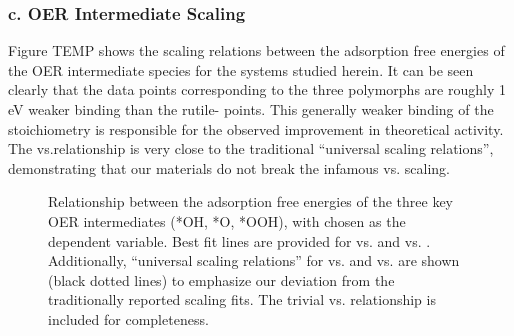 
\subsubsection{c. OER Intermediate Scaling}

Figure TEMP shows the scaling relations between the adsorption free energies of the OER intermediate species for the \IrOx systems studied herein.
It can be seen clearly that the data points corresponding to the three  polymorphs are roughly 1 eV weaker binding than the rutile- points.
This generally weaker binding of the  stoichiometry is responsible for the observed improvement in theoretical activity.
The \DGOOH vs.\DGOH relationship is very close to the traditional ``universal scaling relations'', demonstrating that our materials do not break the infamous \DGOOH vs. \DGOH scaling.

\begin{figure}
\centering
{}
\caption{\label{fig:scaling_relations}
Relationship between the adsorption free energies of the three key OER intermediates (*OH, *O, *OOH), with \DGOH chosen as the dependent variable.
Best fit lines are provided for \DGOOH vs. \DGOH and \DGO vs. \DGOH.
Additionally, ``universal scaling relations'' for \DGOOH vs. \DGOH and \DGO vs. \DGOH are shown (black dotted lines) to emphasize our deviation from the traditionally reported scaling fits.
The trivial \DGOH vs. \DGOH relationship is included for completeness.
}
\end{figure}

